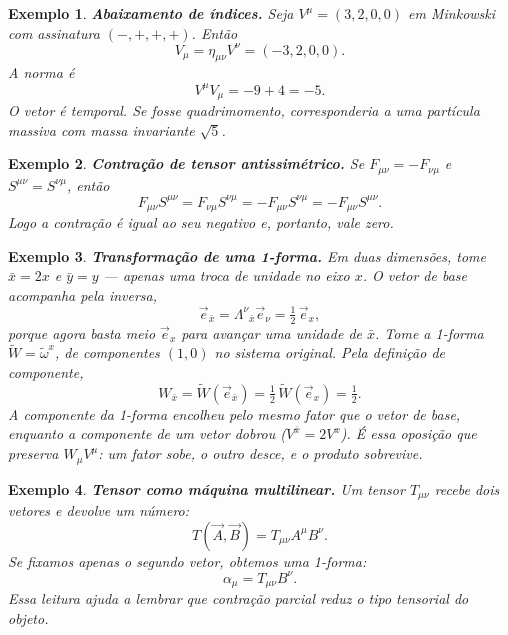 \documentclass[12pt,a4paper,oneside]{book}
\theoremstyle{rgplain}
\newtheorem{example}{Exemplo}[chapter]
\theoremstyle{rgremark}
\begin{document}
\begin{example}
\textbf{Abaixamento de índices.} Seja $V^\mu=(3,2,0,0)$ em Minkowski com
assinatura $(-,+,+,+)$. Então
\[
  V_\mu=\eta_{\mu\nu}V^\nu=(-3,2,0,0).
\]
A norma é
\[
  V^\mu V_\mu=-9+4=-5.
\]
O vetor é temporal. Se fosse quadrimomento, corresponderia a uma partícula
massiva com massa invariante $\sqrt{5}$.
\end{example}

\begin{example}\label{ex:sim-antisim}
\textbf{Contração de tensor antissimétrico.} Se $F_{\mu\nu}=-F_{\nu\mu}$ e
$S^{\mu\nu}=S^{\nu\mu}$, então
\[
  F_{\mu\nu}S^{\mu\nu}
  =F_{\nu\mu}S^{\nu\mu}
  =-F_{\mu\nu}S^{\nu\mu}
  =-F_{\mu\nu}S^{\mu\nu}.
\]
Logo a contração é igual ao seu negativo e, portanto, vale zero.
\end{example}

\begin{example}
\textbf{Transformação de uma 1-forma.} Em duas dimensões, tome $\bar x=2x$ e
$\bar y=y$ --- apenas uma troca de unidade no eixo $x$. O vetor de base acompanha
pela inversa,
\[
  \vec e_{\bar x}=\Lambda^{\nu}{}_{\bar x}\vec e_\nu=\tfrac12\,\vec e_x ,
\]
porque agora basta meio $\vec e_x$ para avançar uma unidade de $\bar x$. Tome a
1-forma $\tilde W=\tilde\omega^x$, de componentes $(1,0)$ no sistema
original. Pela definição de componente,
\[
  W_{\bar x}=\tilde W(\vec e_{\bar x})=\tfrac12\,\tilde W(\vec e_x)=\tfrac12 .
\]
A componente da 1-forma encolheu pelo mesmo fator que o vetor de base,
enquanto a componente de um vetor \emph{dobrou} ($V^{\bar x}=2V^{x}$). É essa
oposição que preserva $W_\mu V^\mu$: um fator sobe, o outro desce, e o
produto sobrevive.
\end{example}

\begin{example}
\textbf{Tensor como máquina multilinear.} Um tensor $T_{\mu\nu}$ recebe dois
vetores e devolve um número:
\[
  T(\vec A,\vec B)=T_{\mu\nu}A^\mu B^\nu.
\]
Se fixamos apenas o segundo vetor, obtemos uma 1-forma:
\[
  \alpha_\mu=T_{\mu\nu}B^\nu.
\]
Essa leitura ajuda a lembrar que contração parcial reduz o tipo tensorial do
objeto.
\end{example}
\end{document}
